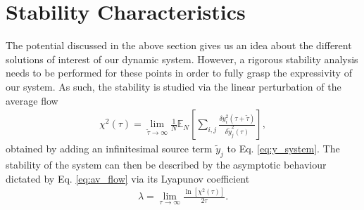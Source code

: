 \documentclass[reprint,amsmath,amssymb,aps]{revtex4-2}
\begin{document}








\section{Stability Characteristics}
\label{StabilityAnalysis}

The potential discussed in the above section gives us an idea about the different solutions of interest of our dynamic system. However, a rigorous stability analysis needs to be performed for these points in order to fully grasp the expressivity of our system. As such, the stability is studied via the linear perturbation of the average flow 
\begin{align}
\label{eq:av_flow}
\chi^2(\tau)= 
\lim_{\tilde{\tau}\to\infty}
\frac{1}{N}
\mathbb{E}_N\left[
\sum_{i,j}
\frac{\delta y_i^2(\tau+\tilde{\tau})}{\delta \tilde{y}_j^2(\tau)}
\right],
\end{align}
obtained by adding an infinitesimal source term $\tilde{y}_j$ to Eq. \eqref{eq:y_system}. The stability of the system can then be described by the asymptotic behaviour dictated by Eq. \eqref{eq:av_flow} via its Lyapunov coefficient
\begin{align}
\label{eq:ljupanov}
    \lambda = \lim_{\tau\to\infty} \frac{\ln\left[\chi^2(\tau)\right]}{2\tau}.
\end{align}
\end{document}
